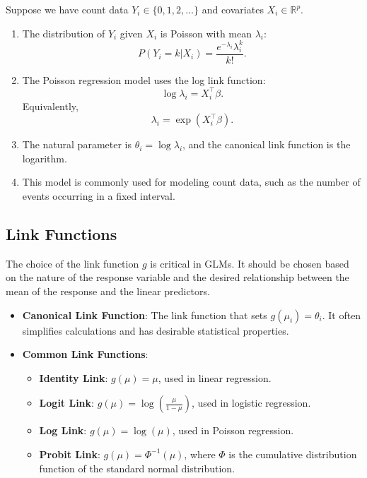 \documentclass[open=any, 11pt,paper=A4]{scrreprt}
\begin{document}
\begin{example}
Suppose we have count data $Y_i \in \{0, 1, 2, \dots\}$ and covariates $X_i \in \mathbb{R}^p$.

\begin{enumerate}
    \item The distribution of $Y_i$ given $X_i$ is Poisson with mean $\lambda_i$:
    \[
    P(Y_i = k | X_i) = \frac{e^{-\lambda_i} \lambda_i^k}{k!}.
    \]
    \item The Poisson regression model uses the log link function:
    \[
    \log \lambda_i = X_i^\top \beta.
    \]
    Equivalently,
    \[
    \lambda_i = \exp(X_i^\top \beta).
    \]
    \item The natural parameter is $\theta_i = \log \lambda_i$, and the canonical link function is the logarithm.
    \item This model is commonly used for modeling count data, such as the number of events occurring in a fixed interval.
\end{enumerate}
\end{example}

\subsection{Link Functions}

The choice of the link function $g$ is critical in GLMs. It should be chosen based on the nature of the response variable and the desired relationship between the mean of the response and the linear predictors.

\begin{itemize}
    \item \textbf{Canonical Link Function}: The link function that sets $g(\mu_i) = \theta_i$. It often simplifies calculations and has desirable statistical properties.
    \item \textbf{Common Link Functions}:
    \begin{itemize}
        \item \textbf{Identity Link}: $g(\mu) = \mu$, used in linear regression.
        \item \textbf{Logit Link}: $g(\mu) = \log\left( \frac{\mu}{1 - \mu} \right)$, used in logistic regression.
        \item \textbf{Log Link}: $g(\mu) = \log(\mu)$, used in Poisson regression.
        \item \textbf{Probit Link}: $g(\mu) = \Phi^{-1}(\mu)$, where $\Phi$ is the cumulative distribution function of the standard normal distribution.
    \end{itemize}
\end{itemize}
\end{document}
